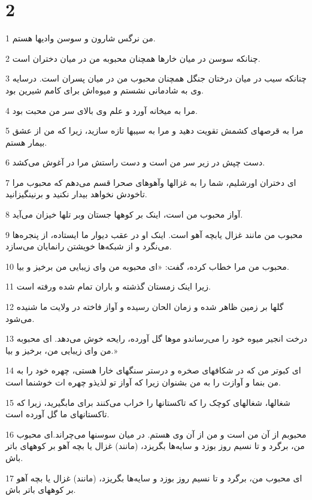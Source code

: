 \chapter{2}

\par 1 من نرگس شارون و سوسن وادیها هستم.
\par 2 چنانکه سوسن در میان خارها همچنان محبوبه من در میان دختران است.
\par 3 چنانکه سیب در میان درختان جنگل همچنان محبوب من در میان پسران است. درسایه وی به شادمانی نشستم و میوه‌اش برای کامم شیرین بود.
\par 4 مرا به میخانه آورد و علم وی بالای سر من محبت بود.
\par 5 مرا به قرصهای کشمش تقویت دهید و مرا به سیبها تازه سازید، زیرا که من از عشق بیمار هستم.
\par 6 دست چپش در زیر سر من است و دست راستش مرا در آغوش می‌کشد.
\par 7 ‌ای دختران اورشلیم، شما را به غزالها وآهوهای صحرا قسم می‌دهم که محبوب مرا تاخودش نخواهد بیدار نکنید و برنینگیزانید.
\par 8 آواز محبوب من است، اینک بر کوهها جستان وبر تلها خیزان می‌آید.
\par 9 محبوب من مانند غزال یابچه آهو است. اینک او در عقب دیوار ما ایستاده، از پنجره‌ها می‌نگرد و از شبکه‌ها خویشتن رانمایان می‌سازد.
\par 10 محبوب من مرا خطاب کرده، گفت: «ای محبوبه من و‌ای زیبایی من برخیز و بیا.
\par 11 زیرا اینک زمستان گذشته و باران تمام شده ورفته است.
\par 12 گلها بر زمین ظاهر شده و زمان الحان رسیده و آواز فاخته در ولایت ما شنیده می‌شود.
\par 13 درخت انجیر میوه خود را می‌رساندو موها گل آورده، رایحه خوش می‌دهد. ای محبوبه من و‌ای زیبایی من، برخیز و بیا.»
\par 14 ‌ای کبوتر من که در شکافهای صخره و درستر سنگهای خارا هستی، چهره خود را به من بنما و آوازت را به من بشنوان زیرا که آواز تو لذیذو چهره ات خوشنما است.
\par 15 شغالها، شغالهای کوچک را که تاکستانها را خراب می‌کنند برای مابگیرید، زیرا که تاکستانهای ما گل آورده است.
\par 16 محبوبم از آن من است و من از آن وی هستم. در میان سوسنها می‌چراند.‌ای محبوب من، برگرد و تا نسیم روز بوزد و سایه‌ها بگریزد، (مانند) غزال یا بچه آهو بر کوههای باتر باش.
\par 17 ‌ای محبوب من، برگرد و تا نسیم روز بوزد و سایه‌ها بگریزد، (مانند) غزال یا بچه آهو بر کوههای باتر باش.
 
